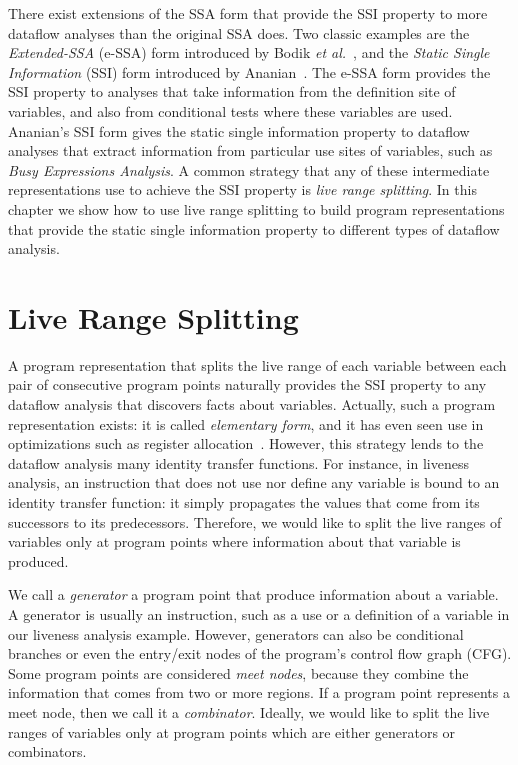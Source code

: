 There exist extensions of the SSA form that provide the SSI property to more
dataflow analyses than the original SSA does.
Two classic examples are the {\em Extended-SSA} (e-SSA) form introduced by Bodik
{\em et al.}~\cite{Bodik00}, and the {\em Static Single Information} (SSI) form
introduced by Ananian~\cite{Ananian99}.
The e-SSA form provides the SSI property to analyses that take information from
the definition site of variables, and also from conditional tests where these
variables are used.
Ananian's SSI form gives the static single information property to dataflow
analyses that extract information from particular use sites of variables, such
as {\em Busy Expressions Analysis}.
A common strategy that any of these intermediate representations use to achieve
the SSI property is {\em live range splitting}.
In this chapter we show how to use live range splitting to build program
representations that provide the static single information property to different
types of dataflow analysis.

\section{Live Range Splitting}
\label{sec:ssi:pereira:split}

A program representation that splits the live range of each variable between each
pair of consecutive program points naturally provides the SSI property to any
dataflow analysis that discovers facts about variables.
Actually, such a program representation exists: it is called {\em elementary
form}, and it has even seen use in optimizations such as register
allocation~\cite{Appel01,Pereira08}.
However, this strategy lends to the dataflow analysis many identity transfer
functions.
For instance, in liveness analysis, an instruction that does not use nor define
any variable is bound to an identity transfer function: it simply propagates the
values that come from its successors to its predecessors.
Therefore, we would like to split the live ranges of variables only at program
points where information about that variable is produced.

We call a {\em generator} a program point that produce information about a
variable.
A generator is usually an instruction, such as a use or a definition of a
variable in our liveness analysis example.
However, generators can also be conditional branches or even the entry/exit
nodes of the program's control flow graph (CFG).
Some program points are considered {\em meet nodes}, because they combine the
information that comes from two or more regions.
If a program point represents a meet node, then we call it a
{\em combinator}.
Ideally, we would like to split the live ranges of variables only at program
points which are either generators or combinators.

